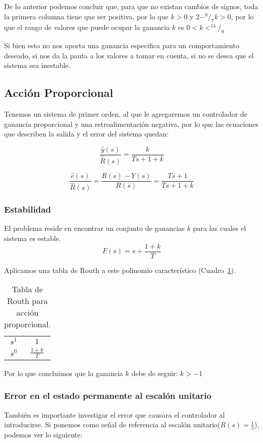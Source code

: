 De lo anterior podemos concluir que, para que no existan cambios de signos, toda la primera columna tiene que ser positiva, por lo que $k > 0$ y  $2 - ^9/_7 k > 0$, por lo que el rango de valores que puede ocupar la ganancia $k$ es $0 < k < ^{14}/_9$

Si bien esto no nos aporta una ganancia especifica para un comportamiento deseado, si nos da la pauta a los valores a tomar en cuenta, si no se desea que el sistema sea inestable.

\subsection{Acción Proporcional}
Tenemos un sistema de primer orden, al que le agregaremos un controlador de ganancia proporcional y una retroalimentación negativa, por lo que las ecuaciones que describen la salida y el error del sistema quedan:

\begin{equation}
\frac{\hat{y}(s)}{\hat{R}(s)} = \frac{k}{Ts + 1 + k}
\end{equation}

\begin{equation}
\frac{\hat{e}(s)}{\hat{R}(s)} = \frac{R(s) - Y(s)}{R(s)} = \frac{Ts + 1}{Ts + 1 + k}
\end{equation}

\subsubsection{Estabilidad}
El problema reside en encontrar un conjunto de ganancias $k$ para las cuales el sistema es estable.
\begin{equation}
F(s) = s + \frac{1 + k}{T}
\end{equation}

Aplicamos una tabla de Routh a este polinomio característico (Cuadro~\ref{tab:AccionProporcional}).

\begin{table}[htbp]
\centering
\begin{tabular}{c|c}
$s^1$ & $1$ \\
$s^0$ & $\frac{1+k}{T}$
\end{tabular}
\caption{\label{tab:AccionProporcional}Tabla de Routh para acción proporcional.}
\end{table}

Por lo que concluimos que la ganancia $k$ debe de seguir: $k>-1$

\subsubsection{Error en el estado permanente al escalón unitario}
También es importante investigar el error que causara el controlador al introducirse. Si ponemos como señal de referencia al escalón unitario($R(s) = \frac{1}{s}$), podemos ver lo siguiente:

